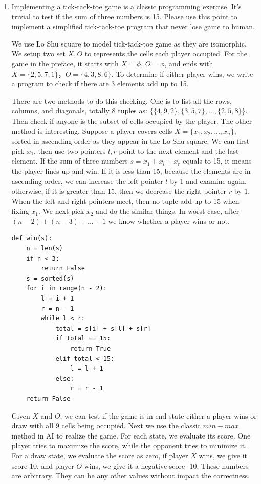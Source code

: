 \documentclass[UTF8]{article}
\begin{document}
\begin{enumerate}
\item{Implementing a tick-tack-toe game is a classic programming exercise. It's trivial to test if the sum of three numbers is 15. Please use this point to implement a simplified tick-tack-toe program that never lose game to human.}

We use Lo Shu square to model tick-tack-toe game as they are isomorphic. We setup two set $X, O$ to represents the cells each player occupied. For the game in the preface, it starts with $X = \phi$, $O = \phi$, and ends with $X = \{ 2, 5, 7, 1 \}$，$O = \{ 4, 3, 8, 6 \}$. To determine if either player wins, we write a program to check if there are 3 elements add up to 15.

There are two methods to do this checking. One is to list all the rows, columns, and diagonals, totally 8 tuples as: $\{ \{4, 9, 2\}, \{3, 5, 7\}, ..., \{2, 5, 8\} \}$. Then check if anyone is the subset of cells occupied by the player. The other method is interesting. Suppose a player covers cells $ X = \{x_1, x_2, ..., x_n\}$, sorted in ascending order as they appear in the Lo Shu square. We can first pick $x_1$, then use two pointers $l, r$ point to the next element and the last element. If the sum of three numbers $s = x_1 + x_l + x_r$ equals to 15, it means the player lines up and win. If it is less than 15, because the elements are in ascending order, we can increase the left pointer $l$ by 1 and examine again. otherwise, if it is greater than 15, then we decrease the right pointer $r$ by 1. When the left and right pointers meet, then no tuple add up to 15 when fixing $x_1$. We next pick $x_2$ and do the similar things. In worst case, after $(n - 2)+ (n - 3) + ... + 1$ we know whether a player wins or not.

\lstset{language=Python
    , frame=single
}
\begin{lstlisting}
def win(s):
    n = len(s)
    if n < 3:
        return False
    s = sorted(s)
    for i in range(n - 2):
        l = i + 1
        r = n - 1
        while l < r:
            total = s[i] + s[l] + s[r]
            if total == 15:
                return True
            elif total < 15:
                l = l + 1
            else:
                r = r - 1
    return False
\end{lstlisting}

Given $X$ and $O$, we can test if the game is in end state either a player wins or draw with all 9 cells being occupied. Next we use the classic $min-max$ method in AI to realize the game. For each state, we evaluate its score. One player tries to maximize the score, while the opponent tries to minimize it. For a draw state, we evaluate the score as zero, if player $X$ wins, we give it score 10, and player $O$ wins, we give it a negative score -10. These numbers are arbitrary. They can be any other values without impact the correctness.


\end{enumerate}
\end{document}
